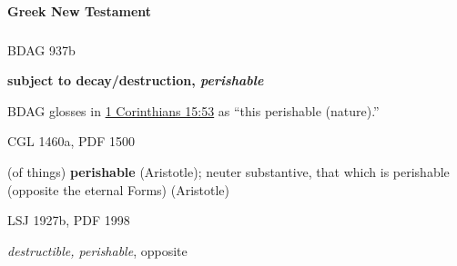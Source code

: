 		\paragraph{Greek New Testament}
			\label{CORRUPTION-GREEK}
			
			\subparagraph{\texorpdfstring{}{}}
				\label{PHTHARTOS}
			
				\begin{compactdesc}
					\item[BDAG 937b] \textbf{}
						\begin{compactitem}
							\item \textbf{subject to decay/destruction, \textit{perishable}}
								\begin{compactitem}
									\item BDAG glosses  in \hyperref[1CORINTHIANS-15-53]{1 Corinthians 15:53} as ``this perishable (nature).''
								\end{compactitem}
						\end{compactitem}
					\item[CGL 1460a, PDF 1500] \textbf{}
						\begin{compactitem}
							\item (of things) \textbf{perishable} (Aristotle); neuter substantive, that which is perishable (opposite the eternal Forms) (Aristotle)
						\end{compactitem}
					\item[LSJ 1927b, PDF 1998] \textbf{}
						\begin{compactitem}
							\item \textit{destructible, perishable}, opposite \hyperref[AIDIOS]{\grl{ἀΐδιος}}
						\end{compactitem}
				\end{compactdesc}
				
		
			\subparagraph{\texorpdfstring{}{}}
				\label{PHTHORA}
			
